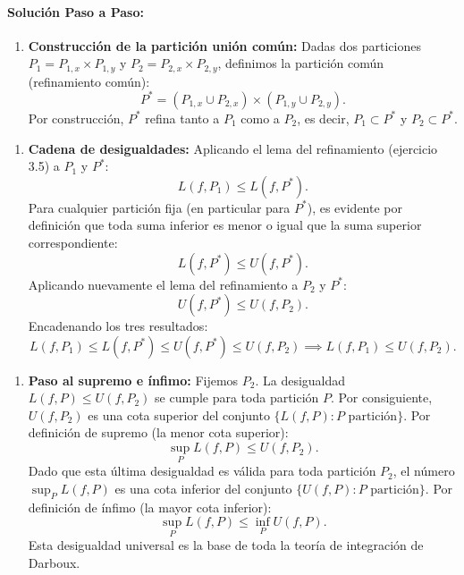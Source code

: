 \documentclass[11pt,a4paper]{article}
\begin{document}
\paragraph{Solución Paso a Paso:}\par
\begin{enumerate}[label=\textbf{\arabic*.}]
\item \textbf{Construcción de la partición unión común:}
Dadas dos particiones $P_1 = P_{1,x} \times P_{1,y}$ y $P_2 = P_{2,x} \times P_{2,y}$, definimos la partición común (refinamiento común):
\begin{equation*}
P^* = (P_{1,x} \cup P_{2,x}) \times (P_{1,y} \cup P_{2,y}).
\end{equation*}
Por construcción, $P^*$ refina tanto a $P_1$ como a $P_2$, es decir, $P_1 \subset P^*$ y $P_2 \subset P^*$.
\end{enumerate}

\begin{enumerate}[label=\textbf{\arabic*.}]
\item \textbf{Cadena de desigualdades:}
Aplicando el lema del refinamiento (ejercicio 3.5) a $P_1$ y $P^*$:
\begin{equation*}
L(f, P_1) \le L(f, P^*).
\end{equation*}
Para cualquier partición fija (en particular para $P^*$), es evidente por definición que toda suma inferior es menor o igual que la suma superior correspondiente:
\begin{equation*}
L(f, P^*) \le U(f, P^*).
\end{equation*}
Aplicando nuevamente el lema del refinamiento a $P_2$ y $P^*$:
\begin{equation*}
U(f, P^*) \le U(f, P_2).
\end{equation*}
Encadenando los tres resultados:
\begin{equation*}
L(f, P_1) \le L(f, P^*) \le U(f, P^*) \le U(f, P_2) \implies L(f, P_1) \le U(f, P_2).
\end{equation*}
\end{enumerate}

\begin{enumerate}[label=\textbf{\arabic*.}]
\item \textbf{Paso al supremo e ínfimo:}
Fijemos $P_2$. La desigualdad $L(f, P) \le U(f, P_2)$ se cumple para toda partición $P$. Por consiguiente, $U(f, P_2)$ es una cota superior del conjunto $\{L(f, P) : P \text{ partición}\}$.
Por definición de supremo (la menor cota superior):
\begin{equation*}
\sup_P L(f, P) \le U(f, P_2).
\end{equation*}
Dado que esta última desigualdad es válida para toda partición $P_2$, el número $\sup_P L(f, P)$ es una cota inferior del conjunto $\{U(f, P) : P \text{ partición}\}$.
Por definición de ínfimo (la mayor cota inferior):
\begin{equation*}
\sup_P L(f, P) \le \inf_P U(f, P).
\end{equation*}
Esta desigualdad universal es la base de toda la teoría de integración de Darboux.
\end{enumerate}
\end{document}

